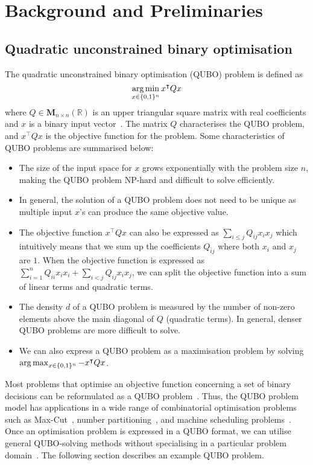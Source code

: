 
\chapter{Background and Preliminaries}
\vspace{2em}

\section{Quadratic unconstrained binary optimisation}
The quadratic unconstrained binary optimisation (QUBO) problem is defined as
\begin{equation} 
\operatorname*{arg\,min}_{x \in \{0, 1\}^n} x^\intercal Q x
\end{equation}
where $Q \in \boldsymbol{M}_{n\times n}(\mathbb{R})$ is an upper triangular square matrix with real coefficients and $x$ is a binary input vector~\cite{b1}. The matrix $Q$ characterises the QUBO problem, and $x^\intercal Q x$ is the objective function for the problem. Some characteristics of QUBO problems are summarised below:
\begin{itemize}
    \item The size of the input space for $x$ grows exponentially with the problem size $n$, making the QUBO problem NP-hard and difficult to solve efficiently.
    \item In general, the solution of a QUBO problem does not need to be unique as multiple input $x$'s can produce the same objective value.
    \item The objective function $x^\intercal Q x$ can also be expressed as $\sum_{i \leq j} Q_{ij}x_{i}x_{j}$ which intuitively means that we sum up the coefficients $Q_{ij}$ where both $x_{i}$ and $x_{j}$ are $1$. When the objective function is expressed as $\sum_{i=1}^{n} Q_{ii}x_{i}x_{i} + \sum_{i < j} Q_{ij}x_{i}x_{j}$, we can split the objective function into a sum of linear terms and quadratic terms.
    \item The density $d$ of a QUBO problem is measured by the number of non-zero elements above the main diagonal of $Q$ (quadratic terms). In general, denser QUBO problems are more difficult to solve.
    \item We can also express a QUBO problem as a maximisation problem by solving $\operatorname*{arg\,max}_{x \in \{0, 1\}^n} -x^\intercal Q x$.
\end{itemize}

Most problems that optimise an objective function concerning a set of binary decisions can be reformulated as a QUBO problem~\cite{b5}. Thus, the QUBO problem model has applications in a wide range of combinatorial optimisation problems such as Max-Cut~\cite{b2}, number partitioning~\cite{b3}, and machine scheduling problems~\cite{b4}. Once an optimisation problem is expressed in a QUBO format, we can utilise general QUBO-solving methods without specialising in a particular problem domain~\cite{b1}. The following section describes an example QUBO problem.

